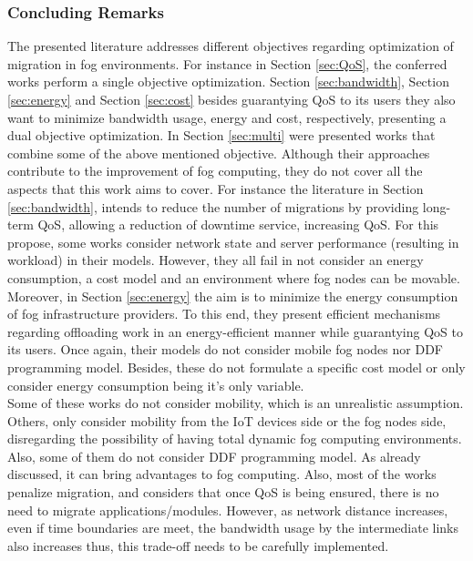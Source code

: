 \subsubsection{Concluding Remarks}
\noindent The presented literature addresses different objectives regarding optimization of migration in fog environments. For instance in Section \ref{sec:QoS}, the conferred works perform a single objective optimization. Section \ref{sec:bandwidth}, Section \ref{sec:energy} and Section \ref{sec:cost} besides guarantying QoS to its users they also want to minimize bandwidth usage, energy and cost, respectively, presenting a dual objective optimization. In Section \ref{sec:multi} were presented works that combine some of the above mentioned objective. Although their approaches contribute to the improvement of fog computing, they do not cover all the aspects that this work aims to cover. For instance the literature in Section \ref{sec:bandwidth}, intends to reduce the number of migrations by providing long-term QoS, allowing a reduction of downtime service, increasing QoS. For this propose, some works consider network state and server performance (resulting in workload) in their models. However, they all fail in not consider an energy consumption, a cost model and an environment where fog nodes can be movable. Moreover, in Section \ref{sec:energy} the aim is to minimize the energy consumption of fog infrastructure providers. To this end, they present efficient mechanisms regarding offloading work in an energy-efficient manner while guarantying QoS to its users. Once again, their models do not consider mobile fog nodes nor DDF programming model. Besides, these do not formulate a specific cost model or only consider energy consumption being it's only variable.\\
\noindent\tab Some of these works do not consider mobility, which is an unrealistic assumption. Others, only consider mobility from the IoT devices side or the fog nodes side, disregarding the possibility of having total dynamic fog computing environments. Also, some of them do not consider DDF programming model. As already discussed, it can bring advantages to fog computing. Also, most of the works penalize migration, and considers that once QoS is being ensured, there is no need to migrate applications/modules. However, as network distance increases, even if time boundaries are meet, the bandwidth usage by the intermediate links also increases thus, this trade-off needs to be carefully implemented.